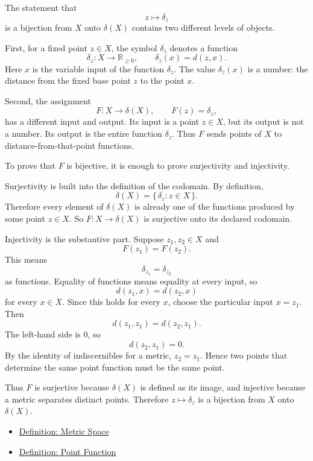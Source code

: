 \begin{remark*}[Exposition]
The statement that
\[
  z\longmapsto\delta_z
\]
is a bijection from \(X\) onto \(\delta(X)\) contains two different levels of
objects.

First, for a fixed point \(z\in X\), the symbol \(\delta_z\) denotes a
function
\[
  \delta_z:X\to\mathbb{R}_{\geq 0},
  \qquad
  \delta_z(x)=d(z,x).
\]
Here \(x\) is the variable input of the function \(\delta_z\).  The value
\(\delta_z(x)\) is a number: the distance from the fixed base point \(z\) to
the point \(x\).

Second, the assignment
\[
  F:X\to\delta(X),
  \qquad
  F(z)=\delta_z,
\]
has a different input and output.  Its input is a point \(z\in X\), but its
output is not a number.  Its output is the entire function \(\delta_z\).
Thus \(F\) sends points of \(X\) to distance-from-that-point functions.

To prove that \(F\) is bijective, it is enough to prove surjectivity and
injectivity.

Surjectivity is built into the definition of the codomain.  By definition,
\[
  \delta(X)=\{\,\delta_z:z\in X\,\}.
\]
Therefore every element of \(\delta(X)\) is already one of the functions
produced by some point \(z\in X\).  So \(F:X\to\delta(X)\) is surjective onto
its declared codomain.

Injectivity is the substantive part.  Suppose \(z_1,z_2\in X\) and
\[
  F(z_1)=F(z_2).
\]
This means
\[
  \delta_{z_1}=\delta_{z_2}
\]
as functions.  Equality of functions means equality at every input, so
\[
  d(z_1,x)=d(z_2,x)
\]
for every \(x\in X\).  Since this holds for every \(x\), choose the particular
input \(x=z_1\).  Then
\[
  d(z_1,z_1)=d(z_2,z_1).
\]
The left-hand side is \(0\), so
\[
  d(z_2,z_1)=0.
\]
By the identity of indiscernibles for a metric, \(z_2=z_1\).  Hence two
points that determine the same point function must be the same point.

Thus \(F\) is surjective because \(\delta(X)\) is defined as its image, and
injective because a metric separates distinct points.  Therefore
\(z\mapsto\delta_z\) is a bijection from \(X\) onto \(\delta(X)\).
\end{remark*}

\begin{dependencies}
\begin{itemize}
  \item \hyperref[def:metric-space]{Definition: Metric Space}
  \item \hyperref[def:metric-point-function]{Definition: Point Function}
\end{itemize}
\end{dependencies}

